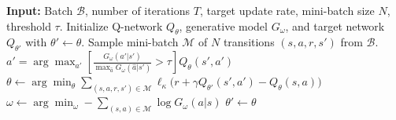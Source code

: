 \begin{algorithm}[t]
\caption{Original BCQ algorithm used as baseline \cite{BCQ_benchmarking}.}
\label{alg:bcq_original}
\begin{algorithmic}[1]
\STATE \textbf{Input:} Batch $\mathcal{B}$, number of iterations $T$, target update rate, mini-batch size $N$, threshold $\tau$.
\STATE Initialize Q-network $Q_\theta$, generative model $G_\omega$, and target network $Q_{\theta'}$ with $\theta' \leftarrow \theta$.
    \STATE Sample mini-batch $\mathcal{M}$ of $N$ transitions $(s,a,r,s')$ from $\mathcal{B}$.
    \STATE $a' = \arg\max_{a'}\!\left[\frac{G_\omega(a'|s')}{\max_{\hat{a}} G_\omega(\hat{a}|s')} > \tau \right] Q_\theta(s',a')$
    \STATE $\theta \leftarrow \arg\min_\theta \sum_{(s,a,r,s') \in \mathcal{M}} \ell_\kappa \big(r + \gamma Q_{\theta'}(s',a') - Q_\theta(s,a)\big)$
    \STATE $\omega \leftarrow \arg\min_\omega - \sum_{(s,a)\in\mathcal{M}} \log G_\omega(a|s)$
        \STATE $\theta' \leftarrow \theta$
    \ENDIF
\ENDFOR
\end{algorithmic}
\end{algorithm}